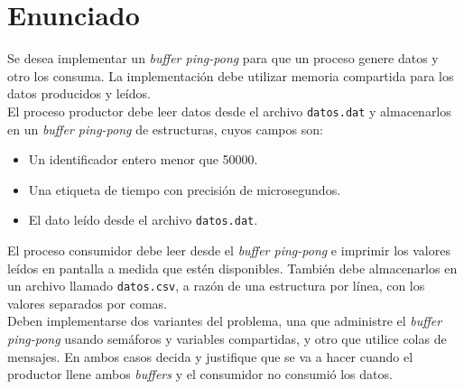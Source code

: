 \section{Enunciado}
Se desea implementar un \textit{buffer ping-pong} para que un proceso genere datos y otro los consuma. La implementación debe utilizar memoria compartida para los datos producidos y leídos.\\

El proceso productor debe leer datos desde el archivo \texttt{datos.dat} y almacenarlos en un \textit{buffer ping-pong} de estructuras, cuyos campos son:\\

\begin{itemize}
    \item Un identificador entero menor que 50000.
    \item Una etiqueta de tiempo con precisión de microsegundos.
    \item El dato leído desde el archivo \texttt{datos.dat}.\\
\end{itemize}

El proceso consumidor debe leer desde el \textit{buffer ping-pong} e imprimir los valores leídos en pantalla a medida que estén disponibles. También debe almacenarlos en un archivo llamado \texttt{datos.csv}, a razón de una estructura por línea, con los valores separados por comas.\\

Deben implementarse dos variantes del problema, una que administre el \textit{buffer ping-pong} usando semáforos y variables compartidas, y otro que utilice colas de mensajes. En ambos casos decida y justifique que se va a hacer cuando el productor llene ambos \textit{buffers} y el consumidor no consumió los datos.